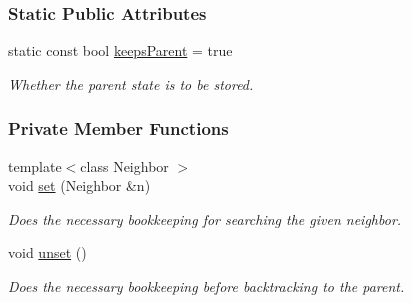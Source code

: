 \subsubsection*{Static Public Attributes}
\begin{DoxyCompactItemize}
\item 
static const bool \hyperlink{structbacktrackLock_1_1Inplace_3_01MyAlgorithm_00_01true_01_4_a81b757ca0b93b1f47743393f94e4d0d9}{keeps\+Parent} = true\hypertarget{structbacktrackLock_1_1Inplace_3_01MyAlgorithm_00_01true_01_4_a81b757ca0b93b1f47743393f94e4d0d9}{}\label{structbacktrackLock_1_1Inplace_3_01MyAlgorithm_00_01true_01_4_a81b757ca0b93b1f47743393f94e4d0d9}

\begin{DoxyCompactList}\small\item\em Whether the parent state is to be stored. \end{DoxyCompactList}\end{DoxyCompactItemize}
\subsubsection*{Private Member Functions}
\begin{DoxyCompactItemize}
\item 
{\footnotesize template$<$class Neighbor $>$ }\\void \hyperlink{structbacktrackLock_1_1Inplace_3_01MyAlgorithm_00_01true_01_4_afe567d9e39a5078be0a698b92da58ae4}{set} (Neighbor \&n)
\begin{DoxyCompactList}\small\item\em Does the necessary bookkeeping for searching the given neighbor. \end{DoxyCompactList}\item 
void \hyperlink{structbacktrackLock_1_1Inplace_3_01MyAlgorithm_00_01true_01_4_ae06e372d27262f364fceb132d293d384}{unset} ()\hypertarget{structbacktrackLock_1_1Inplace_3_01MyAlgorithm_00_01true_01_4_ae06e372d27262f364fceb132d293d384}{}\label{structbacktrackLock_1_1Inplace_3_01MyAlgorithm_00_01true_01_4_ae06e372d27262f364fceb132d293d384}

\begin{DoxyCompactList}\small\item\em Does the necessary bookkeeping before backtracking to the parent. \end{DoxyCompactList}\end{DoxyCompactItemize}
